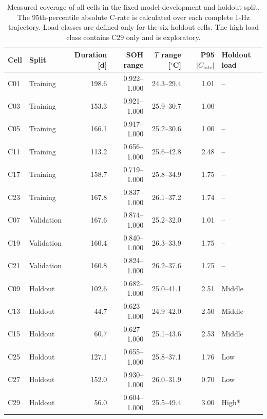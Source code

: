\begin{table}[!htbp]
\centering
\scriptsize
\caption{Measured coverage of all cells in the fixed model-development and holdout split. The 95th-percentile absolute C-rate is calculated over each complete 1-Hz trajectory. Load classes are defined only for the six holdout cells. The high-load class contains C29 only and is exploratory.}
\label{tab:dataset_cell_split_coverage}
\setlength{\tabcolsep}{5pt}
\begin{tabular}{llrrrrl}
\toprule
Cell & Split & Duration [d] & SOH range & $T$ range [$^{\circ}$C] & P95 $|C_{\mathrm{rate}}|$ & Holdout load \\
\midrule
C01 & Training & 198.6 & 0.922--1.000 & 24.3--29.4 & 1.01 & -- \\
C03 & Training & 153.3 & 0.921--1.000 & 25.9--30.7 & 1.00 & -- \\
C05 & Training & 166.1 & 0.917--1.000 & 25.2--30.6 & 1.00 & -- \\
C11 & Training & 113.2 & 0.656--1.000 & 25.6--42.8 & 2.48 & -- \\
C17 & Training & 158.7 & 0.719--1.000 & 25.8--34.9 & 1.75 & -- \\
C23 & Training & 167.8 & 0.837--1.000 & 26.1--37.2 & 1.74 & -- \\
\addlinespace[2pt]
C07 & Validation & 167.6 & 0.874--1.000 & 25.2--32.0 & 1.01 & -- \\
C19 & Validation & 160.4 & 0.840--1.000 & 26.3--33.9 & 1.75 & -- \\
C21 & Validation & 160.8 & 0.824--1.000 & 26.2--37.6 & 1.75 & -- \\
\addlinespace[2pt]
C09 & Holdout & 102.6 & 0.682--1.000 & 25.0--41.1 & 2.51 & Middle \\
C13 & Holdout & 44.7 & 0.623--1.000 & 24.9--42.0 & 2.50 & Middle \\
C15 & Holdout & 60.7 & 0.627--1.000 & 25.1--43.6 & 2.53 & Middle \\
C25 & Holdout & 127.1 & 0.655--1.000 & 25.8--37.1 & 1.76 & Low \\
C27 & Holdout & 152.0 & 0.930--1.000 & 26.0--31.9 & 0.70 & Low \\
C29 & Holdout & 56.0 & 0.604--1.000 & 25.5--49.4 & 3.00 & High* \\
\bottomrule
\end{tabular}
\end{table}
